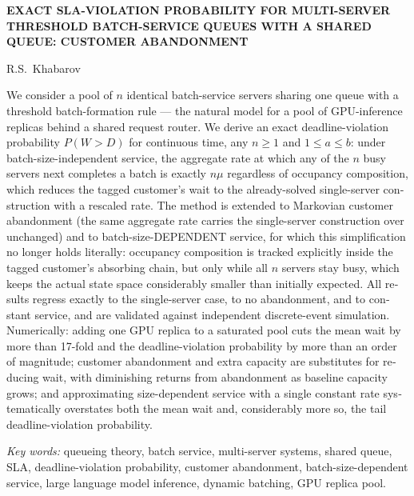 \documentclass[12pt,a4paper]{article}
\begin{document}
\bigskip
\begin{center}
\begin{minipage}{0.9\linewidth}
\centering
{\bfseries EXACT SLA-VIOLATION PROBABILITY FOR MULTI-SERVER THRESHOLD BATCH-SERVICE QUEUES WITH A SHARED QUEUE: CUSTOMER ABANDONMENT}
\end{minipage}
\end{center}

\begin{center}
\small R.S.~Khabarov
\end{center}

\begin{otherlanguage}{english}
\small
We consider a pool of $n$ identical batch-service servers sharing one queue with a threshold batch-formation rule --- the natural model for a pool of GPU-inference replicas behind a shared request router. We derive an exact deadline-violation probability $P(W>D)$ for continuous time, any $n\ge1$ and $1\le a\le b$: under batch-size-independent service, the aggregate rate at which any of the $n$ busy servers next completes a batch is exactly $n\mu$ regardless of occupancy composition, which reduces the tagged customer's wait to the already-solved single-server construction with a rescaled rate. The method is extended to Markovian customer abandonment (the same aggregate rate carries the single-server construction over unchanged) and to batch-size-DEPENDENT service, for which this simplification no longer holds literally: occupancy composition is tracked explicitly inside the tagged customer's absorbing chain, but only while all $n$ servers stay busy, which keeps the actual state space considerably smaller than initially expected. All results regress exactly to the single-server case, to no abandonment, and to constant service, and are validated against independent discrete-event simulation. Numerically: adding one GPU replica to a saturated pool cuts the mean wait by more than 17-fold and the deadline-violation probability by more than an order of magnitude; customer abandonment and extra capacity are substitutes for reducing wait, with diminishing returns from abandonment as baseline capacity grows; and approximating size-dependent service with a single constant rate systematically overstates both the mean wait and, considerably more so, the tail deadline-violation probability.

\medskip
\noindent\textit{Key words:} queueing theory, batch service, multi-server systems, shared queue, SLA, deadline-violation probability, customer abandonment, batch-size-dependent service, large language model inference, dynamic batching, GPU replica pool.
\end{otherlanguage}
\normalsize
\end{document}
